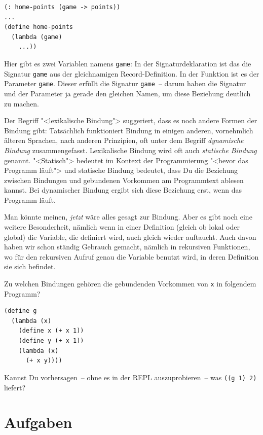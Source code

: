 \begin{lstlisting}
(: home-points (game -> points))
...
(define home-points
  (lambda (game)
    ...))
\end{lstlisting}
%
Hier gibt es zwei Variablen namens \lstinline{game}: In der
Signaturdeklaration ist das die Signatur \lstinline{game} aus der
gleichnamigen Record-Definition.  In der Funktion ist es der Parameter
\lstinline{game}.  Dieser erfüllt die Signatur \lstinline{game}~--
darum haben die Signatur und der Parameter ja gerade den gleichen
Namen, um diese Beziehung deutlich zu machen.

Der Begriff "<lexikalische Bindung"> suggeriert, dass es noch andere
Formen der Bindung gibt: Tatsächlich funktioniert Bindung in einigen
anderen, vornehmlich älteren Sprachen, nach anderen Prinzipien, oft
unter dem Begriff \textit{dynamische Bindung} zusammengefasst.  Lexikalische
Bindung wird oft auch \textit{statische Bindung} genannt.  "<Statisch"> bedeutet
im Kontext der Programmierung "<bevor das Programm läuft"> und
statische Bindung bedeutet, dass Du die Beziehung zwischen Bindungen
und gebundenen Vorkommen am Programmtext ablesen kannst.  Bei
dynamischer Bindung ergibt sich diese Beziehung erst, wenn das
Programm läuft.

Man könnte meinen, \emph{jetzt} wäre alles gesagt zur Bindung.  Aber
es gibt noch eine weitere Besonderheit, nämlich wenn in einer
Definition (gleich ob lokal oder global) die Variable, die definiert
wird, auch gleich wieder auftaucht.  Auch davon haben wir schon
ständig Gebrauch gemacht, nämlich in rekursiven Funktionen, wo für den
rekursiven Aufruf genau die Variable benutzt wird, in deren Definition
sie sich befindet.

\begin{aufgabeinline}
  Zu welchen Bindungen gehören die gebundenden Vorkommen von
  \lstinline{x} in folgendem Programm?
\begin{lstlisting}
(define g
  (lambda (x)
    (define x (+ x 1))
    (define y (+ x 1))
    (lambda (x)
      (+ x y))))
\end{lstlisting}
  Kannst Du vorhersagen~-- ohne es in der REPL auszuprobieren~-- was
  \lstinline{((g 1) 2)} liefert?
\end{aufgabeinline}


\section*{Aufgaben}

